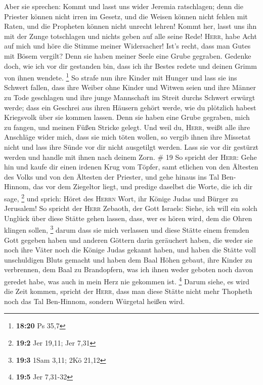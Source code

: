  Aber sie sprechen: Kommt und lasst uns wider Jeremia
ratschlagen; denn die Priester können nicht irren im Gesetz, und die
Weisen können nicht fehlen mit Raten, und die Propheten können nicht
unrecht lehren! Kommt her, lasst uns ihn mit der Zunge totschlagen und
nichts geben auf alle seine Rede!  \textsc{Herr}, habe
Acht auf mich und höre die Stimme meiner Widersacher! 
Ist's recht, dass man Gutes mit Bösem vergilt? Denn sie haben meiner
Seele eine Grube gegraben. Gedenke doch, wie ich vor dir gestanden bin,
dass ich ihr Bestes redete und deinen Grimm von ihnen wendete.
\footnote{\textbf{18:20} Ps 35,7}  So strafe nun ihre
Kinder mit Hunger und lass sie ins Schwert fallen, dass ihre Weiber ohne
Kinder und Witwen seien und ihre Männer zu Tode geschlagen und ihre
junge Mannschaft im Streit durchs Schwert erwürgt werde; 
dass ein Geschrei aus ihren Häusern gehört werde, wie du plötzlich
habest Kriegsvolk über sie kommen lassen. Denn sie haben eine Grube
gegraben, mich zu fangen, und meinen Füßen Stricke gelegt.
 Und weil du, \textsc{Herr}, weißt alle ihre Anschläge
wider mich, dass sie mich töten wollen, so vergib ihnen ihre Missetat
nicht und lass ihre Sünde vor dir nicht ausgetilgt werden. Lass sie vor
dir gestürzt werden und handle mit ihnen nach deinem Zorn. \# 19
 So spricht der \textsc{Herr}: Gehe hin und kaufe dir
einen irdenen Krug vom Töpfer, samt etlichen von den Ältesten des Volks
und von den Ältesten der Priester,  und gehe hinaus ins
Tal Ben-Hinnom, das vor dem Ziegeltor liegt, und predige daselbst die
Worte, die ich dir sage, \footnote{\textbf{19:2} Jer 19,11; Jer 7,31}
 und sprich: Höret des \textsc{Herrn} Wort, ihr Könige
Judas und Bürger zu Jerusalem! So spricht der \textsc{Herr} Zebaoth, der
Gott Israels: Siehe, ich will ein solch Unglück über diese Stätte gehen
lassen, dass, wer es hören wird, dem die Ohren klingen sollen,
\footnote{\textbf{19:3} 1Sam 3,11; 2Kö 21,12}  darum dass
sie mich verlassen und diese Stätte einem fremden Gott gegeben haben und
anderen Göttern darin geräuchert haben, die weder sie noch ihre Väter
noch die Könige Judas gekannt haben, und haben die Stätte voll
unschuldigen Bluts gemacht  und haben dem Baal Höhen
gebaut, ihre Kinder zu verbrennen, dem Baal zu Brandopfern, was ich
ihnen weder geboten noch davon geredet habe, was auch in mein Herz nie
gekommen ist. \footnote{\textbf{19:5} Jer 7,31-32}  Darum
siehe, es wird die Zeit kommen, spricht der \textsc{Herr}, dass man
diese Stätte nicht mehr Thopheth noch das Tal Ben-Hinnom, sondern
Würgetal heißen wird.

